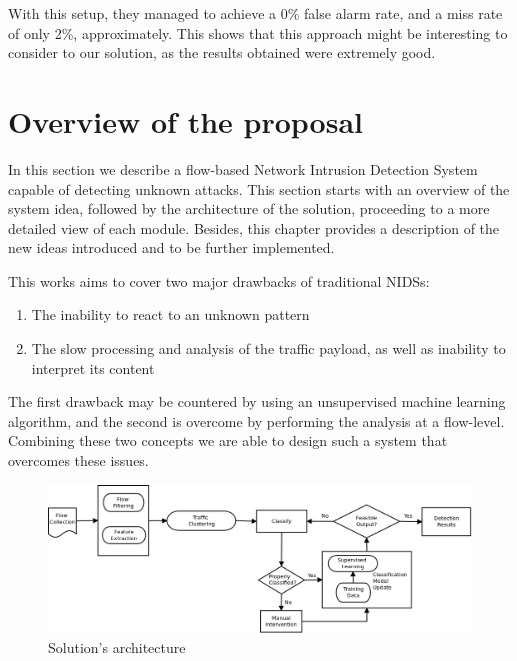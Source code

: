 \documentclass[runningheads,a4paper]{llncs}
\begin{document}
With this setup, they managed to achieve a 0\% false alarm rate, and a miss rate of only 2\%, approximately. This shows that this approach might be interesting to consider to our solution, as the results obtained were extremely good. 
 
\section{Overview of the proposal}\label{sec:arch}

In this section we describe a flow-based Network Intrusion Detection System capable of detecting unknown attacks. 
This section starts with an overview of the system idea, followed by the
architecture of the solution, proceeding to a more detailed view of each module. Besides, this
chapter provides a description of the new ideas introduced and to be further implemented.

This works aims to cover two major drawbacks of traditional NIDSs:
\begin{enumerate}
\item The inability to react to an unknown pattern
\item The slow processing and analysis of the traffic payload, as well as inability to interpret its content
\end{enumerate}

The first drawback may be countered by using an unsupervised machine learning algorithm, and the second is overcome by performing the analysis at a flow-level. Combining these two concepts we are able to design such a system that overcomes these issues. 

\begin{figure}[htp]
\centering
\includegraphics[scale=0.2]{solution.png}
\caption{Solution's architecture}
\label{fig:sol}
\end{figure}
\end{document}

